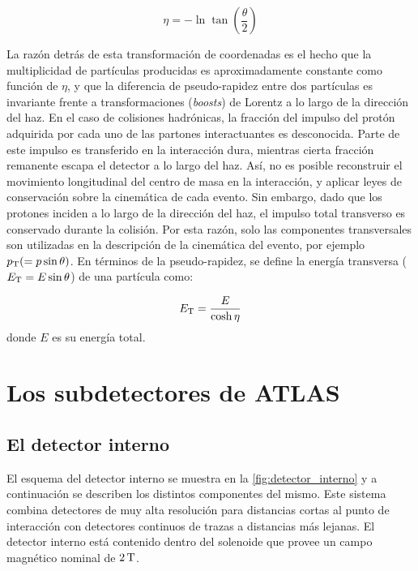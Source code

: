 \begin{equation}
  \eta = - \ln \tan \left( \frac{\theta}{2} \right)
\end{equation}

La razón detrás de esta transformación de coordenadas es el hecho que la
multiplicidad de partículas producidas es aproximadamente constante como función
de $\eta$, y que la diferencia de pseudo-rapidez entre dos partículas es
invariante frente a transformaciones (\emph{boosts}) de Lorentz a lo largo de la
dirección del haz. En el caso de colisiones hadrónicas, la fracción del impulso
del protón adquirida por cada uno de las partones interactuantes es desconocida.
Parte de este impulso es transferido en la interacción dura, mientras cierta
fracción remanente escapa el detector a lo largo del haz. Así, no es posible
reconstruir el movimiento longitudinal del centro de masa en la interacción, y
aplicar leyes de conservación sobre la cinemática de cada evento. Sin embargo,
dado que los protones inciden a lo largo de la dirección del haz, el impulso
total transverso es conservado durante la colisión. Por esta razón, solo las
componentes transversales son utilizadas en la descripción de la cinemática del
evento, por ejemplo $p_{\mathrm{T}} (= p \sin \theta)$. En términos de
la pseudo-rapidez, se define la energía transversa ($E_{\mathrm{T}} = E \sin \theta$) de una partícula como:


\begin{equation}
  \et = \frac{E}{\cosh \eta}
\end{equation}
%
donde $E$ es su energía total.


\section{Los subdetectores de ATLAS}


\subsection{El detector interno}

El esquema del detector interno se muestra en la \cref{fig:detector_interno} y a
continuación se describen los distintos componentes del mismo. Este sistema
combina detectores de muy alta resolución para distancias cortas al punto de
interacción con detectores continuos de trazas a distancias más lejanas. El
detector interno está contenido dentro del solenoide que provee un campo
magnético nominal de $\unit[2]{T}$.


